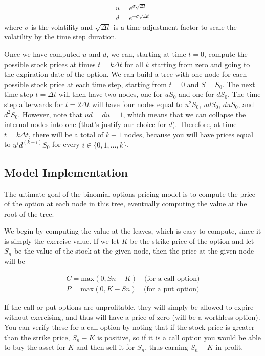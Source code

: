 \begin{equation}
\begin{gathered}
u = e^{\sigma\sqrt{\Delta t}}\\
d = e^{-\sigma\sqrt{\Delta t}}
\end{gathered}
\end{equation}
where $\sigma$ is the volatility and $\sqrt{\Delta t}$ is a time-adjustment factor to scale the volatility by the time step duration.

Once we have computed $u$ and $d$, we can, starting at time $t = 0$, compute the possible stock prices
at times $t = k\Delta t$ for all $k$ starting from zero and going to the expiration date of the option. We can build
a tree with one node for each possible stock price at each time step, starting from $t = 0$ and $S = S_0$. The
next time step $t = \Delta t$ will then have two nodes, one for $uS_0$ and one for $dS_0$. The time step afterwards
for $t = 2\Delta t$ will have four nodes equal to $u^2 S_0$, $udS_0$, $duS_0$, and $d^2 S_0$. 
However, note that $ud = du = 1$, which means that we can collapse the internal nodes into one (that's justify our choice for $d$). Therefore, at time $t = k\Delta t$, there will be a total of $k + 1$ nodes, because you will have prices equal to $u^i d^{(k−i)} S_0$ for every $i \in \{0, 1,\dots , k\}$.

\subsection{Model Implementation}
The ultimate goal of the binomial options pricing model is to compute the price of the option at
each node in this tree, eventually computing the value at the root of the tree. 

We begin by computing the value at the leaves, which is easy to compute, since it is simply the exercise value.
If we let $K$ be the strike price of the option and let $S_n$ be the value of the stock at the given node, then
the price at the given node will be

\begin{equation}
	\begin{gathered}
C = \textrm{max} (0, Sn − K)\quad \textrm{(for a call option)}\\
P = \textrm{max} (0, K − Sn)\quad \textrm{(for a put option)}
	\end{gathered}
\end{equation}

If the call or put options are unprofitable, they will simply be allowed to expire without exercising, and
thus will have a price of zero (will be a worthless option). You can verify these for a call option by noting
that if the stock price is greater than the strike price, $S_n − K$ is positive, so if it is a call option you would
be able to buy the asset for $K$ and then sell it for $S_n$, thus earning $S_n − K$ in profit.

